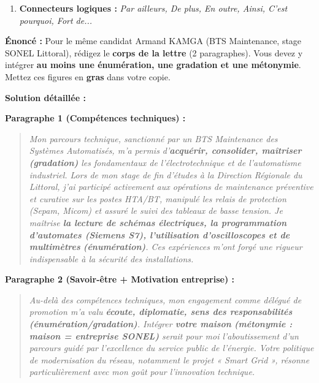 \documentclass[11pt]{article}
\newcommand{\cle}[1]{{\popxbold\color{popdark}#1}}
\begin{document}
\begin{methode}
\begin{enumerate}
\begin{itemize}
\begin{itemize}
                        \item \cle{Hyperbole} (Mesurée) : \textit{« Une \textbf{forte} motivation »}, \textit{« Un \textbf{vif} intérêt »}. Effet : intensité. \textbf{Attention :} Pas de mensonge.
                    \end{itemize}
            \end{itemize}
        \item \textbf{Connecteurs logiques :} \textit{Par ailleurs, De plus, En outre, Ainsi, C'est pourquoi, Fort de...}
    \end{enumerate}
\end{methode}

\begin{exoresolu}
    \textbf{Énoncé :} Pour le même candidat Armand KAMGA (BTS Maintenance, stage SONEL Littoral), rédigez le \textbf{corps de la lettre} (2 paragraphes). Vous devez y intégrer \textbf{au moins une énumération, une gradation et une métonymie}. Mettez ces figures en \textbf{gras} dans votre copie.

    \tcblower
    \textbf{Solution détaillée :}

    \textbf{Paragraphe 1 (Compétences techniques) :}
    \begin{quote}
    \textit{Mon parcours technique, sanctionné par un BTS Maintenance des Systèmes Automatisés, m'a permis d'\textbf{acquérir, consolider, maîtriser} \textbf{(gradation)} les fondamentaux de l'électrotechnique et de l'automatisme industriel. Lors de mon stage de fin d'études à la Direction Régionale du Littoral, j'ai participé activement aux opérations de maintenance préventive et curative sur les postes HTA/BT, manipulé les relais de protection (Sepam, Micom) et assuré le suivi des tableaux de basse tension. Je maîtrise \textbf{la lecture de schémas électriques, la programmation d'automates (Siemens S7), l'utilisation d'oscilloscopes et de multimètres} \textbf{(énumération)}. Ces expériences m'ont forgé une rigueur indispensable à la sécurité des installations.}
    \end{quote}

    \textbf{Paragraphe 2 (Savoir-être + Motivation entreprise) :}
    \begin{quote}
    \textit{Au-delà des compétences techniques, mon engagement comme délégué de promotion m'a valu \textbf{écoute, diplomatie, sens des responsabilités} \textbf{(énumération/gradation)}. Intégrer \textbf{votre maison} \textbf{(métonymie : maison = entreprise SONEL)} serait pour moi l'aboutissement d'un parcours guidé par l'excellence du service public de l'énergie. Votre politique de modernisation du réseau, notamment le projet « Smart Grid », résonne particulièrement avec mon goût pour l'innovation technique.}
    \end{quote}


\end{exoresolu}
\end{document}
